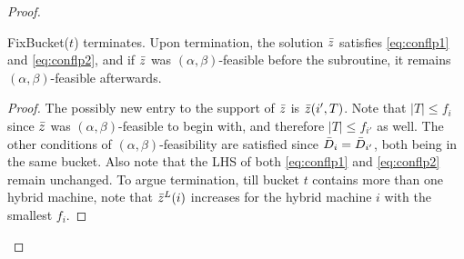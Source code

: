 \begin{proof}
%	
\begin{claim}\label{clm:step2}
	{\sf FixBucket}($t$) terminates. Upon termination, the solution $\bar z$ satisfies \eqref{eq:conflp1} and \eqref{eq:conflp2}, and
	if $\bar z$ was $(\alpha,\beta)$-feasible before the subroutine, it remains $(\alpha,\beta)$-feasible afterwards.
\end{claim}
	\begin{proof}
The possibly new entry to the support of $\bar z$ is $\bar z(i',T)$. Note that $|T| \leq f_i$ since $\bar z$ was $(\alpha,\beta)$-feasible to begin with,  and therefore $|T|\leq f_{i'}$ as well.
The other conditions of $(\alpha,\beta)$-feasibility are satisfied since $\bar{D}_i = \bar{D}_{i'}$, both being in the same bucket.
Also note that the LHS of both \eqref{eq:conflp1} and \eqref{eq:conflp2} remain unchanged.
To argue termination, till bucket $t$ contains more than one hybrid machine, note that $\bar z^L(i)$ increases for the hybrid machine $i$ with the smallest $f_i$. 
	\end{proof}




%	
%	
	
%	
	

\end{proof}
